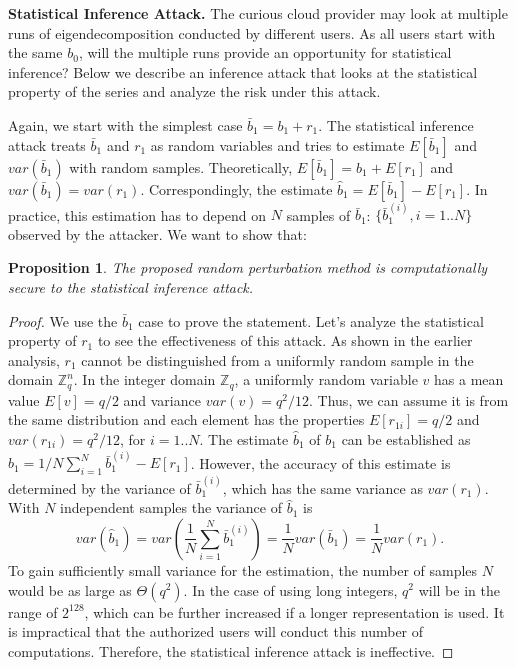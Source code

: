 \documentclass[10pt, conference, compsocconf]{IEEEtran}
\newtheorem{prop}[thm]{Proposition}
\begin{document}
\textbf{Statistical Inference Attack.} The curious cloud provider may look at multiple runs of eigendecomposition conducted by different users. As all users start with the same $b_0$, will the multiple runs provide an opportunity for statistical inference? Below we describe an inference attack that looks at the statistical property of the series and analyze the risk under this attack. 


Again, we start with the simplest case $\bar{b}_1=b_1+r_1$. The statistical inference attack treats $\bar{b}_1$ and $r_1$ as random variables and tries to estimate $E[\bar{b}_1]$ and $var(\bar{b}_1)$ with random samples. Theoretically, $E[\bar{b}_1] = b_1 + E[r_1]$ and $var(\bar{b}_1)=var(r_1)$. Correspondingly, the estimate $\hat{b}_1 = E[\bar{b}_1] - E[r_1]$. In practice, this estimation has to depend on  $N$ samples of $\bar{b}_1$: $\{\bar{b}_1^{(i)}, i=1..N\}$ observed by the attacker. We want to show that:
\begin{prop}
The proposed random perturbation method is computationally secure to the statistical inference attack.
\end{prop}
\begin{proof}
We use the $\bar{b}_1$ case to prove the statement. Let's analyze the statistical property of $r_1$ to see the effectiveness of this attack. 
As shown in the earlier analysis, $r_1$ cannot be distinguished from a uniformly random sample in the domain $\mathbb{Z}_q^n$. In the integer domain $\mathbb{Z}_q$, a uniformly random variable $v$ has a mean value $E[v] =q/2$ and variance $var(v)=q^2/12$.
Thus, we can assume it is from the same distribution and each element has the properties $E[r_{1i}] = q/2$ and $var(r_{1i})=q^2/12$, for $i=1..N$. The estimate $\hat{b}_1$ of $b_1$ can be established as $\hat{b}_1 = 1/N\sum_{i=1}^N \bar{b}_1^{(i)} - E[r_1]$. However, the accuracy of this estimate is determined by the variance of $\bar{b}_1^{(i)}$, which has the same variance as $var(r_1)$. With  $N$ independent samples the variance of $\hat{b}_1$ is
\[
 var(\hat{b}_1) = var(\frac{1}{N} \sum_{i=1}^N \bar{b}_1^{(i)}) = \frac{1}{N} var(\bar{b}_1)=\frac{1}{N}var(r_1).
 \]
To gain sufficiently small variance for the estimation, the number of samples $N$ would be as large as $\Theta(q^2)$. In the case of using long integers, $q^2$ will be in the range of $2^{128}$, which can be further increased if a longer representation is used. It is impractical that the authorized users will conduct this number of computations. Therefore, the statistical inference attack is ineffective. 
\end{proof}
\end{document}
